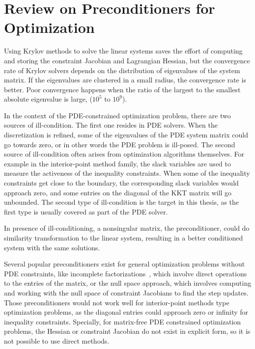 \section{Review on Preconditioners for Optimization}\label{2:krylov:pc}
Using Krylov methods to solve the linear systems saves the effort of computing and storing the constraint Jacobian and Lagrangian Hessian, but the convergence rate of Krylov solvers depends on the distribution of eigenvalues of the system matrix. If the eigenvalues are clustered in a small radius, the convergence rate is better. Poor convergence happens when the ratio of the largest to the smallest absolute eigenvalue is large, ($10^5$ to $10^9$). 

In the context of the PDE-constrained optimization problem, there are two sources of ill-condition. The first one resides in PDE solvers. When the discretization is refined, some of the eigenvalues of the PDE system matrix could go towards zero, or in other words the PDE problem is ill-posed. The second source of ill-condition often arises from optimization algorithms themselves. For example in the interior-point method family, the slack variables are used to measure the activeness of the inequality constraints. When some of the inequality constraints get close to the boundary, the corresponding slack variables would approach zero, and some entries on the diagonal of the KKT matrix will go unbounded. The second type of ill-condition is the target in this thesis, as the first type is usually covered as part of the PDE solver.     

In presence of ill-conditioning, a nonsingular matrix, the preconditioner, could do similarity transformation to the linear system, resulting in a better conditioned system with the same solutions.   

Several popular preconditioners exist for general optimization problems without PDE constraints, like incomplete factorizations~\cite{saad:2003}, which involve direct operations to the entries of the matrix,
or the null space approach, which involves computing and working with the null space of constraint Jacobians to find the step updates. Those preconditioners would not work well for interior-point methods type optimization problems, as the diagonal entries could approach zero or infinity for inequality constraints. Specially, for matrix-free PDE constrained optimization problems, the Hessian or constraint Jacobian do not exist in explicit form, so it is not possible to use direct methods.  

